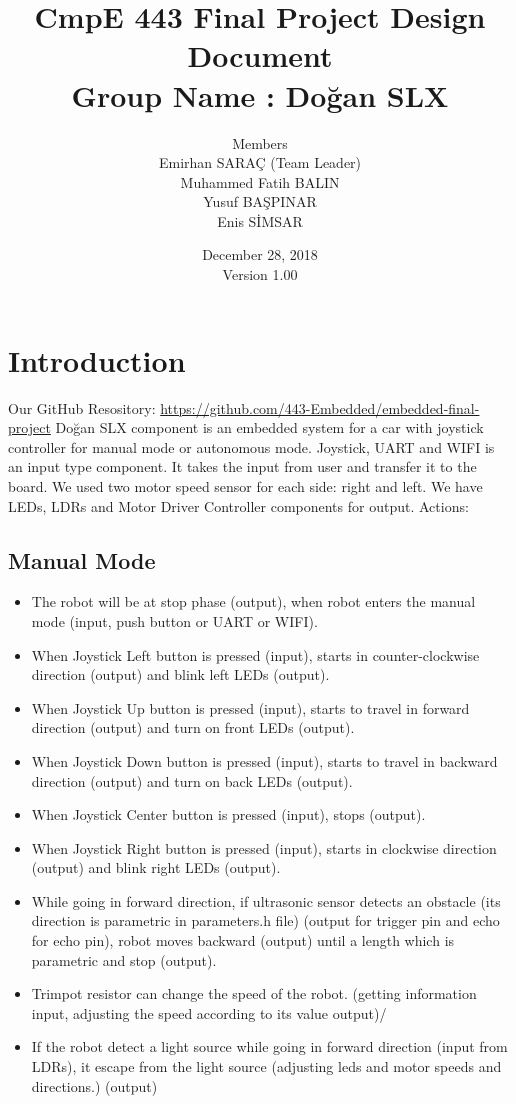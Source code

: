 \documentclass[12pt]{article}
\title{{\Huge CmpE 443 Final Project Design Document} \\ Group Name : Doğan SLX  }
\author{Members \\ Emirhan SARAÇ (Team Leader) \\ Muhammed Fatih BALIN\\ Yusuf BAŞPINAR \\ Enis SİMSAR }
\date{December 28, 2018 \\ Version 1.00}
\begin{document}
\maketitle
\break
\tableofcontents
\newpage
\section{Introduction}
Our GitHub Resository: \newline \url{https://github.com/443-Embedded/embedded-final-project} \newline
Doğan SLX component is an embedded system for a car with joystick controller for manual mode or autonomous mode. 
Joystick, UART and WIFI is an input type component. It takes the input from user and transfer it to the board. We used two motor speed sensor for each side: right and left. We have LEDs, LDRs and Motor Driver Controller components for output. Actions:

\subsection{Manual Mode}
\begin{itemize}
    \item The robot will be at stop phase (output), when robot enters the manual mode (input, push button or UART or WIFI).
    \item When Joystick Left button is pressed (input), starts in counter-clockwise direction (output) and blink left LEDs (output).
    \item When Joystick Up button is pressed (input), starts to travel in forward direction (output) and turn on front LEDs (output).
    \item When Joystick Down button is pressed (input), starts to travel in backward direction (output) and turn on back LEDs (output).
    \item When Joystick Center button is pressed (input), stops (output).
    \item When Joystick Right button is pressed (input), starts in clockwise direction (output) and blink right LEDs (output).
    \item While going in forward direction, if ultrasonic sensor detects an obstacle (its direction is parametric in parameters.h file) (output for trigger pin and echo for echo pin), robot moves backward (output) until a length which is parametric and stop (output).
    \item Trimpot resistor can change the speed of the robot. (getting information input, adjusting the speed according to its value output)/
    \item If the robot detect a light source while going in forward direction (input from LDRs), it escape from the light source (adjusting leds and motor speeds and directions.) (output)
\end{itemize}
\end{document}
